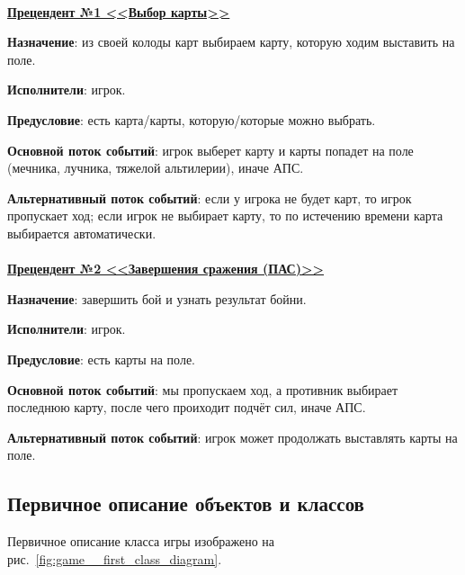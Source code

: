 \documentclass[12pt, a4paper, simple]{eskdtext}
\begin{document}
    \paragraph{}\hspace{0pt}

    \textbf{\underline{Прецендент №1 <<Выбор карты>>}}

    \textbf{Назначение}: из своей колоды карт выбираем карту, которую ходим выставить на поле.

    \textbf{Исполнители}: игрок.

    \textbf{Предусловие}: есть карта/карты, которую/которые можно выбрать.

    \textbf{Основной поток событий}: игрок выберет карту и карты попадет на поле (мечника, лучника, тяжелой альтилерии),
    иначе АПС.

    \textbf{Альтернативный поток событий}: если у игрока не будет карт, то игрок пропускает ход;
    если игрок не выбирает карту, то по истечению времени карта выбирается автоматически.

    \paragraph{}\hspace{0pt}

    \textbf{\underline{Прецендент №2 <<Завершения сражения (ПАС)>>}}

    \textbf{Назначение}: завершить бой и узнать результат бойни.

    \textbf{Исполнители}: игрок.

    \textbf{Предусловие}: есть карты на поле.

    \textbf{Основной поток событий}: мы пропускаем ход, а противник выбирает последнюю карту, после чего проиходит подчёт сил, иначе АПС.

    \textbf{Альтернативный поток событий}: игрок может продолжать выставлять карты на поле.

    \newpage
    \subsection{Первичное описание объектов и классов}

    Первичное описание класса игры изображено на рис.~\ref{fig:game__first_class_diagram}.
\end{document}
